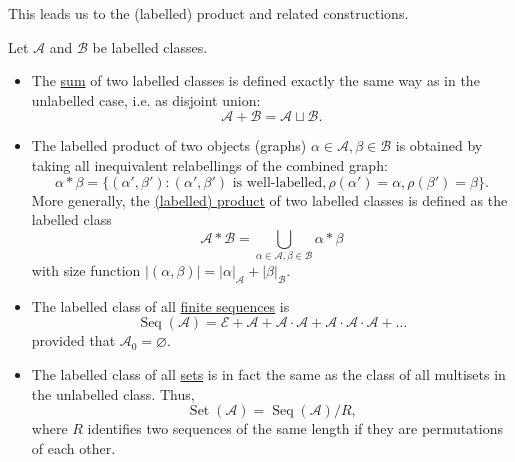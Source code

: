 \noindent This leads us to the (labelled) product and related constructions.

\begin{defn}
Let $\mathcal{A}$ and $\mathcal{B}$ be labelled classes.
\begin{itemize}
    \item The \ul{sum} of two labelled classes is defined exactly the same way as in the unlabelled case, i.e. as disjoint union:
    \begin{equation*}
        \mathcal{A} + \mathcal{B} = \mathcal{A} \sqcup \mathcal{B}.
    \end{equation*}
    
    \item The labelled product of two objects (graphs) $\alpha \in \mathcal{A}, \beta \in \mathcal{B}$ is obtained by taking all inequivalent relabellings of the combined graph:
    \begin{equation*}
        \alpha \ast \beta = \{ (\alpha', \beta') : (\alpha', \beta') \text{ is well-labelled}, \rho(\alpha') = \alpha, \rho(\beta') = \beta \}.
    \end{equation*}
    More generally, the \ul{(labelled) product} of two labelled classes is defined as the labelled class
    \begin{equation*}
        \mathcal{A} \ast \mathcal{B} = \bigcup_{\alpha \in \mathcal{A}, \beta \in \mathcal{B}} \alpha \ast \beta
    \end{equation*}
    with size function $|(\alpha, \beta)| = |\alpha|_\mathcal{A} + |\beta|_\mathcal{B}$.
    
    \item The labelled class of all \ul{finite sequences} is 
    \begin{equation*}
        \operatorname{Seq}(\mathcal{A}) = \mathcal{E} + \mathcal{A} + \mathcal{A} \cdot \mathcal{A} + \mathcal{A} \cdot \mathcal{A} \cdot \mathcal{A} + \dots
    \end{equation*}
    provided that $\mathcal{A}_0 = \varnothing$.
    
    \item The labelled class of all \ul{sets} is in fact the same as the class of all multisets in the unlabelled class. 
    Thus, 
    \begin{equation*}
        \operatorname{Set}(\mathcal{A}) = \operatorname{Seq}(\mathcal{A}) / R, 
    \end{equation*}
    where $R$ identifies two sequences of the same length if they are permutations of each other.
    

\end{itemize}
\end{defn}
